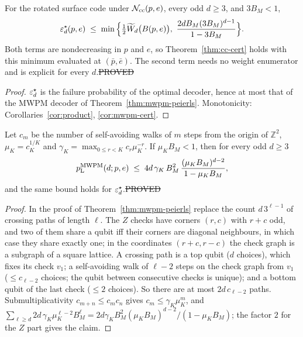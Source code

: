 \begin{proposition}\label{prop:ml-peierls}
For the rotated surface code under $\mathcal{N}_{\rm cc}(p,e)$, every odd $d\ge3$, and $3B_M<1$,
\[
\varepsilon^{\star}_d(p,e)\;\le\;\min\Big\{\tfrac12\widetilde W_d\big(B(p,e)\big),\ \frac{2dB_M(3B_M)^{d-1}}{1-3B_M}\Big\}.
\]
Both terms are nondecreasing in $p$ and $e$, so Theorem~\ref{thm:cc-cert} holds with this minimum evaluated at $(\bar p,\bar e)$. The second term needs no weight enumerator and is explicit for every $d$.\hfill\st{PROVED}
\end{proposition}
\begin{proof}
$\varepsilon^{\star}_d$ is the failure probability of the optimal decoder, hence at most that of the MWPM decoder of Theorem~\ref{thm:mwpm-peierls}. Monotonicity: Corollaries~\ref{cor:product}, \ref{cor:mwpm-cert}.
\end{proof}

\begin{proposition}\label{prop:saw}
Let $c_m$ be the number of self-avoiding walks of $m$ steps from the origin of $\mathbb Z^2$, $\mu_K=c_K^{1/K}$ and $\gamma_K=\max_{0\le r<K}c_r\mu_K^{-r}$. If $\mu_KB_M<1$, then for every odd $d\ge3$
\[
p_{\mathrm{L}}^{\rm MWPM}(d;p,e)\;\le\;4d\,\gamma_K\,B_M^2\,\frac{(\mu_KB_M)^{d-2}}{1-\mu_KB_M},
\]
and the same bound holds for $\varepsilon^{\star}_d$.\hfill\st{PROVED}
\end{proposition}
\begin{proof}
In the proof of Theorem~\ref{thm:mwpm-peierls} replace the count $d\,3^{\ell-1}$ of crossing paths of length $\ell$. The $Z$ checks have corners $(r,c)$ with $r+c$ odd, and two of them share a qubit iff their corners are diagonal neighbours, in which case they share exactly one; in the coordinates $(r+c,r-c)$ the check graph is a subgraph of a square lattice. A crossing path is a top qubit ($d$ choices), which fixes its check $v_1$; a self-avoiding walk of $\ell-2$ steps on the check graph from $v_1$ ($\le c_{\ell-2}$ choices; the qubit between consecutive checks is unique); and a bottom qubit of the last check ($\le2$ choices). So there are at most $2d\,c_{\ell-2}$ paths. Submultiplicativity $c_{m+n}\le c_mc_n$ \cite{MS} gives $c_m\le\gamma_K\mu_K^m$, and $\sum_{\ell\ge d}2d\,\gamma_K\mu_K^{\ell-2}B_M^\ell=2d\gamma_KB_M^2(\mu_KB_M)^{d-2}/(1-\mu_KB_M)$; the factor $2$ for the $Z$ part gives the claim.
\end{proof}

